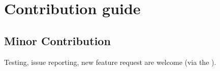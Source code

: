 \documentclass[letterpaper,10pt,english]{sphinxmanual}
\begin{document}
\begin{sphinxVerbatim}[commandchars=\\\{\}]
                    
     
 
\end{sphinxVerbatim}

\begin{sphinxVerbatim}[commandchars=\\\{\}]
 
\end{sphinxVerbatim}

\noindent{}


\chapter{Contribution guide}
\label{\detokenize{contribute:contribution-guide}}\label{\detokenize{contribute:nbviewer}}\label{\detokenize{contribute::doc}}

\section{Minor Contribution}
\label{\detokenize{contribute:minor-contribution}}
Testing, issue reporting, new feature request are welcome (via the ).
\end{document}
